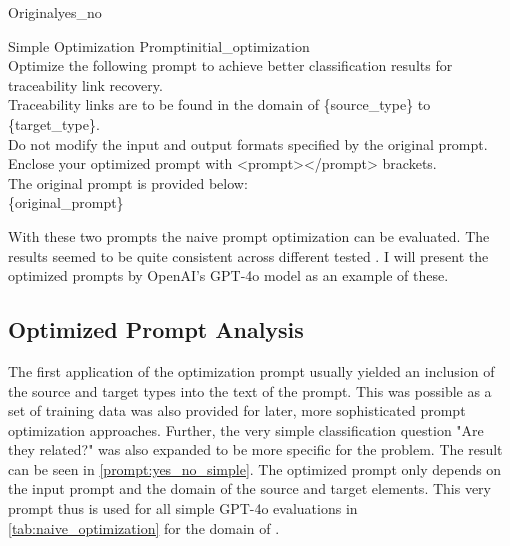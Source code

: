 \begin{prompt}{\KISS Original}{yes_no}\\

\end{prompt}

\begin{prompt}{Simple Optimization Prompt}{initial_optimization}\\
    Optimize the following prompt to achieve better classification results for traceability link recovery. \\
    Traceability links are to be found in the domain of \{source\_type\} to \{target\_type\}. \\
    Do not modify the input and output formats specified by the original prompt.\\
    Enclose your optimized prompt with <prompt></prompt> brackets.\\
    The original prompt is provided below:\\
    \tripplequote\{original\_prompt\}\tripplequote
\end{prompt}

With these two prompts the naive prompt optimization can be evaluated. The results seemed to be quite consistent across different tested \LLMs. I will present the optimized prompts by OpenAI's GPT-4o model as an example of these.

\subsection{Optimized Prompt Analysis}
The first application of the optimization prompt usually yielded an inclusion of the source and target types into the text of the prompt. This was possible as a set of training data was also provided for later, more sophisticated prompt optimization approaches. Further, the very simple classification question "Are they related?" was also expanded to be more specific for the \TLR problem.  The result can be seen in \autoref{prompt:yes_no_simple}.
The optimized prompt only depends on the input prompt and the domain of the source and target elements. This very prompt thus is used for all simple GPT-4o evaluations in \autoref{tab:naive_optimization} for the domain of \RtR. 

